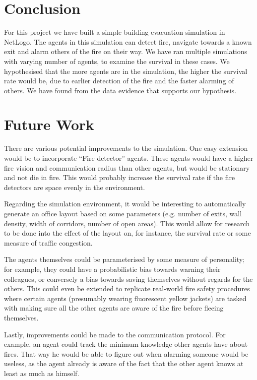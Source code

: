 \documentclass[a4paper]{article}
\begin{document}
\section{Conclusion}
For this project we have built a simple building evacuation simulation in NetLogo. The agents in this simulation can detect fire, navigate towards a known exit and alarm others of the fire on their way. We have ran multiple simulations with varying number of agents, to examine the survival in these cases. We hypothesised that the more agents are in the simulation, the higher the survival rate would be, due to earlier detection of the fire and the faster alarming of others. We have found from the data evidence that supports our hypothesis. 

\section{Future Work}
There are various potential improvements to the simulation. One easy extension would be to incorporate ``Fire detector'' agents. These agents would have a higher fire vision and communication radius than other agents, but would be stationary and not die in fire. This would probably increase the survival rate if the fire detectors are space evenly in the environment.

Regarding the simulation environment, it
would be interesting to automatically generate an office layout based on some
parameters (e.g. number of exits, wall density, width of corridors, number of
open areas). This would allow for research to be done into the effect of the
layout on, for instance, the survival rate or some measure of traffic congestion.

The agents themselves could be parameterised by some measure of personality; for
example, they could have a probabilistic bias towards warning their colleagues,
or conversely a bias towards saving themselves without regards for the others.
This could even be extended to replicate real-world fire safety procedures where
certain agents (presumably wearing fluorescent yellow jackets) are tasked with
making sure all the other agents are aware of the fire before fleeing themselves.

Lastly, improvements could be made to the communication protocol. For example, an agent could track the minimum knowledge other agents have about fires. That way he would be able to figure out when alarming someone would be useless, as the agent already is aware of the fact that the other agent knows at least as much as himself.
\end{document}
